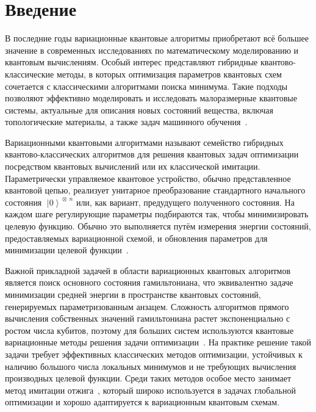 \documentclass[a4paper]{report}
\newcommand{\ket}[1] {\!\!\;\ensuremath{\left|#1\right\rangle}}
\begin{document}
\setcounter{page}{2}
\tableofcontents
\newpage

\chapter*{Введение}

В последние годы вариационные квантовые алгоритмы приобретают всё большее значение в современных исследованиях по математическому моделированию и квантовым вычислениям. Особый интерес представляют гибридные квантово-классические методы, в которых оптимизация параметров квантовых схем сочетается с классическими алгоритмами поиска минимума. Такие подходы позволяют эффективно моделировать и исследовать малоразмерные квантовые системы, актуальные для описания новых состояний вещества, включая топологические материалы, а также задач машинного обучения~\cite{Preskill2018, Schuld2015, Biamonte2017, Harrow2009}.

Вариационными квантовыми алгоритмами называют семейство гибридных квантово-классических алгоритмов для решения квантовых задач оптимизации посредством квантовых вычислений или их классической имитации.  Параметрически управляемое квантовое устройство, обычно представленное квантовой цепью, реализует унитарное преобразование стандартного начального состояния ${\ket{0}^{\!\otimes\:\! n}}$ или, как вариант, предудущего полученного состояния. На каждом шаге регулирующие параметры подбираются так, чтобы минимизировать целевую функцию. Обычно это выполняется путём измерения энергии состояний, предоставляемых вариационной схемой, и обновления параметров для минимизации целевой функции~\cite{Moll2018, Havlicek2019, Cerezo2021}.

Важной прикладной задачей в области вариационных квантовых алгоритмов является поиск основного состояния гамильтониана, что эквивалентно задаче минимизации средней энергии в пространстве квантовых состояний, генерируемых параметризованным анзацем. Сложность алгоритмов прямого вычисления собственных значений гамильтониана растет экспоненциально с ростом числа кубитов, поэтому для больших систем используются квантовые вариационные методы решения задачи оптимизации~\cite{Peruzzo2014, Farhi2014}. На практике решение такой задачи требует эффективных классических методов оптимизации, устойчивых к наличию большого числа локальных минимумов и не требующих вычисления производных целевой функции. Среди таких методов особое место занимает метод имитации отжига~\cite{Salamon2002, Lopatin2005}, который широко используется в задачах глобальной оптимизации и хорошо адаптируется к вариационным квантовым схемам.
\end{document}
